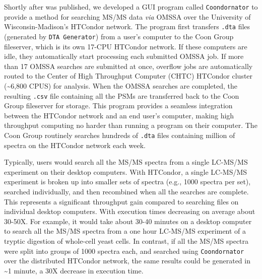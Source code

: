 Shortly after \compass{} was published, we developed a GUI program called \texttt{Coondornator} to provide a method for searching MS/MS data \emph{via} OMSSA over the University of Wisconsin-Madison's HTCondor network. The program first transfers \texttt{.dta} files (generated by \texttt{DTA Generator}) from a user's computer to the Coon Group fileserver, which is its own 17-CPU HTCondor network. If these computers are idle, they automatically start processing each submitted OMSSA job. If more than 17 OMSSA searches are submitted at once, overflow jobs are automatically routed to the Center of High Throughput Computer (CHTC) HTCondor cluster (\textasciitilde6,800 CPUS) for analysis. When the OMSSA searches are completed, the resulting \texttt{.csv} file containing all the PSMs are transferred back to the Coon Group fileserver for storage. This program provides a seamless integration between the HTCondor network and an end user's computer, making high throughput computing no harder than running a program on their computer. The Coon Group routinely searches hundreds of \texttt{.dta} files containing million of spectra on the HTCondor network each week.

Typically, users would search all the MS/MS spectra from a single LC-MS/MS experiment on their desktop computers. With HTCondor, a single LC-MS/MS experiment is broken up into smaller sets of spectra (e.g., 1000 spectra per set), searched individually, and then recombined when all the searches are complete. This represents a significant throughput gain compared to searching files on individual desktop computers. With execution times decreasing on average about 30-50X. For example, it would take about 30-40 minutes on a desktop computer to search all the MS/MS spectra from a one hour LC-MS/MS experiment of a tryptic digestion of whole-cell yeast cells. In contrast, if all the MS/MS spectra were split into groups of 1000 spectra each, and searched using \texttt{Coondornator} over the distributed HTCondor network, the same results could be generated in \textasciitilde1 minute, a 30X decrease in execution time.

